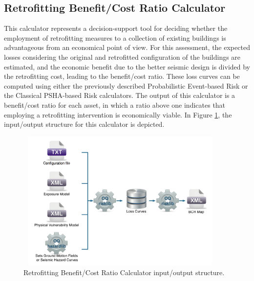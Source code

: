\subsection{Retrofitting Benefit/Cost Ratio Calculator}
This calculator represents a decision-support tool for deciding whether the employment of retrofitting measures to a collection of existing buildings is advantageous from an economical point of view. For this assessment, the expected losses considering the original and retrofitted configuration of the buildings are estimated, and the economic benefit due to the better seismic design is divided by the retrofitting cost, leading to the benefit/cost ratio. These loss curves can be computed using either the previously described Probabilistic Event-based Risk or the Classical PSHA-based Risk calculators. The output of this calculator is a benefit/cost ratio for each asset, in which a ratio above one indicates that employing  a retrofitting intervention is economically viable. In Figure \ref{fig:BCR}, the input/output structure for this calculator is depicted.

\begin{figure}[ht]
\centering
\includegraphics[width=10.5cm,height=7cm]{figures/risk/BCR.pdf}
\caption{Retrofitting Benefit/Cost Ratio Calculator input/output structure.}
\label{fig:BCR}
\end{figure}